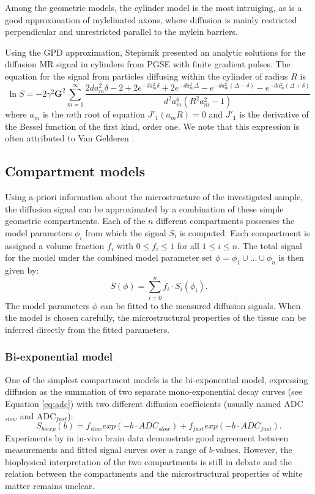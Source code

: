Among the geometric models, the cylinder model is the most intruiging, as is a good approximation of mylelinated axons, where diffusion is mainly restricted perpendicular and unrestricted parallel to the mylein barriers. 

Using the GPD approximation, Stepisnik \cite{stepisnik1993time} presented an analytic solutions for the diffusion MR signal in cylinders from PGSE with finite gradient pulses. The equation for the signal from particles diffusing within the cylinder of radius $R$ is
\begin{equation}
\ln S = -2\gamma^{2}\textbf{G}^{2}\sum_{m=1}^{\infty}\frac{2da_{m}^{2}\delta-2+2e^{-da_{m}^{2}\delta}+2e^{-da_{m}^{2}\Delta}- e^{-da_{m}^{2}(\Delta-\delta)} -e^{-da_{m}^{2}(\Delta+\delta)}}{d^{2}a_{m}^{6}(R^{2}a_{m}^{2}- 1)}
\label{biganal}
\end{equation}
where  $a_{m}$ is the $m$th root of equation  $J'_{1}(a_{m}R)= 0$ and $J'_{1}$ is the derivative of the Bessel function of the first kind, order one. We note that this expression is often attributed to Van Gelderen \cite{Gelderen}.

\subsection{Compartment models}
\label{sec:multicompartment_modeling}
Using a-priori information about the microstructure of the investigated sample, the diffusion signal can be approximated by a combination of these simple geometric compartments. Each of the $n$ different compartments possesses the model parameters $\phi_{i}$ from which the signal $S_i$ is computed. Each compartment is assigned a volume fraction $f_i$ with $0 \le f_i \le 1$ for all $1 \le i \le n$. The total signal for the model under the combined model parameter set $\phi=\phi_{1}\cup\dots\cup\phi_{n}$ is then given by:
\begin{equation}
	S(\phi)=\sum_{i=0}^{n}f_i\cdot S_i(\phi_i).
\end{equation}
The model parameters $\phi$ can be fitted to the measured diffusion signals. When the model is chosen carefully, the microstructural properties of the tissue  can be inferred directly from the fitted parameters.


\subsubsection*{Bi-exponential model}
One of the simplest compartment models is the bi-exponential model, expressing diffusion as the summation of two separate mono-exponential decay curves (see Equation \ref{eq:adc}) with two different diffusion coefficients (usually named \gls{ADC}$_{slow}$ and \gls{ADC}$_{fast}$):
\begin{equation}
	S_{biexp}(b) = f_{slow} exp(-b\cdot ADC_{slow}) + f_{fast} exp(-b\cdot ADC_{fast}).
\end{equation}
Experiments by \citet{Clark:2002} in in-vivo brain data demonstrate good agreement between measurements and fitted signal curves over a range of $b$-values. However, the biophysical interpretation of the two compartments is still in debate and the relation between the compartments and the microstructural properties of white matter remains unclear. 
